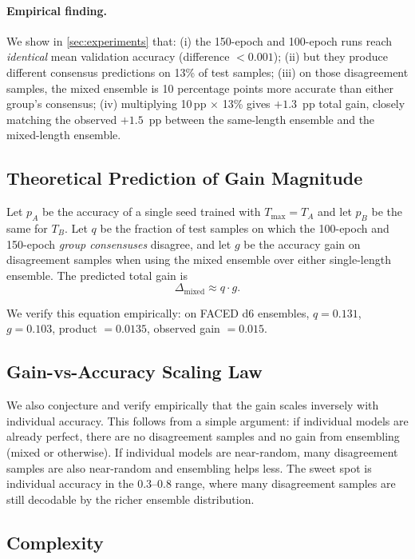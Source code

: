 \paragraph{Empirical finding.}
We show in \cref{sec:experiments} that:
(i) the 150-epoch and 100-epoch runs reach \emph{identical} mean
validation accuracy (difference $<\!0.001$);
(ii) but they produce different consensus predictions on 13\% of test samples;
(iii) on those disagreement samples, the mixed ensemble is 10 percentage
points more accurate than either group's consensus;
(iv) multiplying 10\,pp $\times$ 13\% gives $+1.3$~pp total gain, closely
matching the observed $+1.5$~pp between the same-length ensemble and the
mixed-length ensemble.

\subsection{Theoretical Prediction of Gain Magnitude}

Let $p_A$ be the accuracy of a single seed trained with $T_\mathrm{max}=T_A$
and let $p_B$ be the same for $T_B$. Let $q$ be the fraction of test samples
on which the 100-epoch and 150-epoch \emph{group consensuses} disagree, and
let $g$ be the accuracy gain on disagreement samples when using the mixed
ensemble over either single-length ensemble. The predicted total gain is
\[
\Delta_{\mathrm{mixed}} \approx q \cdot g.
\]

We verify this equation empirically: on FACED d6 ensembles, $q = 0.131$,
$g = 0.103$, product $= 0.0135$, observed gain $= 0.015$.

\subsection{Gain-vs-Accuracy Scaling Law}

We also conjecture and verify empirically that the gain scales inversely
with individual accuracy. This follows from a simple argument: if
individual models are already perfect, there are no disagreement samples
and no gain from ensembling (mixed or otherwise). If individual models are
near-random, many disagreement samples are also near-random and ensembling
helps less. The sweet spot is individual accuracy in the 0.3--0.8 range,
where many disagreement samples are still decodable by the richer
ensemble distribution.

\subsection{Complexity}

